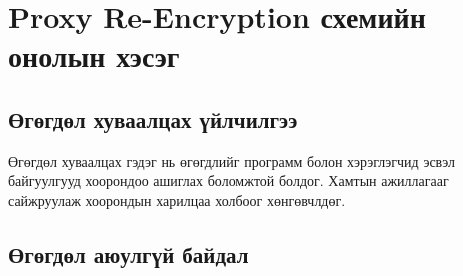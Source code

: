 
\chapter{Proxy Re-Encryption схемийн онолын хэсэг} %
\label{Chapter1} %
\pagecolor{white}

\newcommand{\keyword}[1]{\textbf{#1}}
\newcommand{\tabhead}[1]{\textbf{#1}}
\newcommand{\code}[1]{\texttt{#1}}
\newcommand{\file}[1]{\texttt{\bfseries#1}}
\newcommand{\option}[1]{\texttt{\itshape#1}}


\section{Өгөгдөл хуваалцах үйлчилгээ}
Өгөгдөл хуваалцах гэдэг нь өгөгдлийг программ болон хэрэглэгчид эсвэл байгуулгууд хоорондоо ашиглах боломжтой болдог.
Хамтын ажиллагааг сайжруулаж хоорондын харилцаа холбоог хөнгөвчлдөг.


\section{Өгөгдөл аюулгүй байдал}



